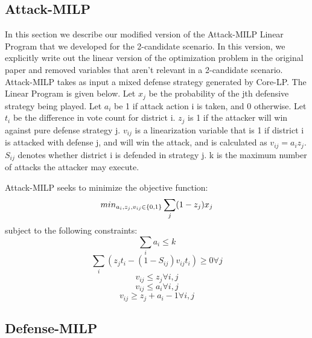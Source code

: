 \documentclass[letterpaper]{article} %
\begin{document}
\subsection{Attack-MILP}
In this section we describe our modified version of the Attack-MILP Linear Program that we developed for the 2-candidate scenario. In this version, we explicitly write out the linear version of the optimization problem in the original paper and removed variables that aren't relevant in a 2-candidate scenario. Attack-MILP takes as input a mixed defense strategy generated by Core-LP. The Linear Program is given below.
Let $x_j$ be the probability of the jth defensive strategy being played. Let $a_i$ be 1 if attack action i is taken, and 0 otherwise. Let $t_i$ be the difference in vote count for district i. $z_j$ is 1 if the attacker will win against pure defense strategy j. $v_{ij}$ is a linearization variable that is 1 if district i is attacked with defense j, and will win the attack, and is calculated as $v_{ij} = a_iz_j$. $S_{ij}$ denotes whether district i is defended in strategy j. k is the maximum number of attacks the attacker may execute. 

Attack-MILP seeks to minimize the objective function:
\begin{equation}
min_{a_i,z_j,v_{ij} \in \{0,1\}}\sum_{j}(1-z_{j})x_j \\
\end{equation}
subject to the following constraints:
\begin{equation}
\sum_{i}a_{i} \leq k
\end{equation}
\begin{equation}
\sum_{i}(z_jt_i-(1-S_{ij})v_{ij}t_i) \geq 0 \forall j
\end{equation}
\begin{equation}
v_{ij} \leq z_j \forall i,j
\end{equation}
\begin{equation}
v_{ij} \leq a_i \forall i,j
\end{equation}
\begin{equation}
v_{ij} \geq z_j+a_i-1 \forall i,j
\end{equation}


\subsection{Defense-MILP}
\end{document}
